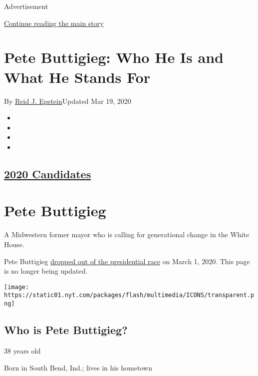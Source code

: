 Advertisement

\protect\hyperlink{after-top}{Continue reading the main story}

\hypertarget{pete-buttigieg-who-he-is-and-what-he-stands-for}{%
\section{Pete Buttigieg: Who He Is and What He Stands
For}\label{pete-buttigieg-who-he-is-and-what-he-stands-for}}

By \href{https://www.nytimes.com/by/reid-j-epstein}{Reid J.
Epstein}Updated Mar 19, 2020

\begin{itemize}
\item
\item
\item
\item
\end{itemize}

\hypertarget{2020-candidates}{%
\subsection{\texorpdfstring{\href{https://www.nytimes.com/interactive/2019/us/politics/2020-presidential-candidates.html}{2020
Candidates}}{2020 Candidates}}\label{2020-candidates}}

\hypertarget{pete-buttigieg}{%
\section{Pete Buttigieg}\label{pete-buttigieg}}

A Midwestern former mayor who is calling for generational change in the
White House.

Pete Buttigieg
\href{https://www.nytimes.com/2020/03/01/us/politics/pete-buttigieg-drops-out.html}{dropped
out of the presidential race} on March 1, 2020. This page is no longer
being updated.

\texttt{[image: https://static01.nyt.com/packages/flash/multimedia/ICONS/transparent.png]}

\hypertarget{who-is-pete-buttigieg}{%
\subsection{Who is Pete Buttigieg?}\label{who-is-pete-buttigieg}}

38 years old

Born in South Bend, Ind.; lives in his hometown

